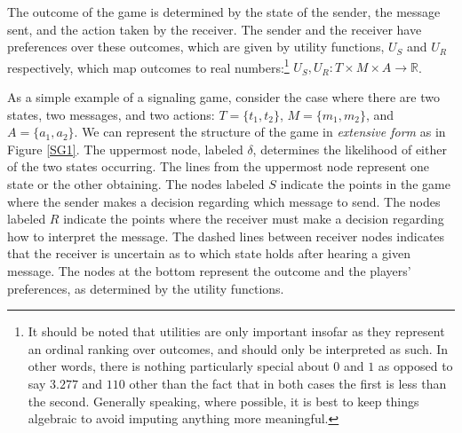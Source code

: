 \documentclass[12pt]{article}
\theoremstyle{definition} \newtheorem{definition}{Definition}
\begin{document}
The outcome of the game is determined by the state of the sender, the message sent, and the action taken by the receiver. The sender and the receiver have preferences over these outcomes, which are given by utility functions, $U_S$ and $U_R$ respectively, which map outcomes to real numbers:\footnote{It should be noted that utilities are only important insofar as they represent an ordinal ranking over outcomes, and should only be interpreted as such. In other words, there is nothing particularly special about $0$ and $1$ as opposed to say $3.277$ and $110$ other than the fact that in both cases the first is less than the second. Generally speaking, where possible, it is best to keep things algebraic to avoid imputing anything more meaningful.} $U_S,U_R:T \times M \times A \rightarrow \mathbb{R}$.

As a simple example of a signaling game, consider the case where there are two states, two messages, and two actions: $T = \{t_1, t_2 \}$, $M = \{m_1, m_2 \}$, and $A = \{a_1, a_2 \}$. We can represent the structure of the game in \emph{extensive form} as in Figure \ref{SG1}. The uppermost node, labeled $\delta$, determines the likelihood of either of the two states occurring. The lines from the uppermost node represent one state or the other obtaining. The nodes labeled $S$ indicate the points in the game where the sender makes a decision regarding which message to send. The nodes labeled $R$ indicate the points where the receiver must make a decision regarding how to interpret the message. The dashed lines between receiver nodes indicates that the receiver is uncertain as to which state holds after hearing a given message. The nodes at the bottom represent the outcome and the players' preferences, as determined by the utility functions.
\end{document}
